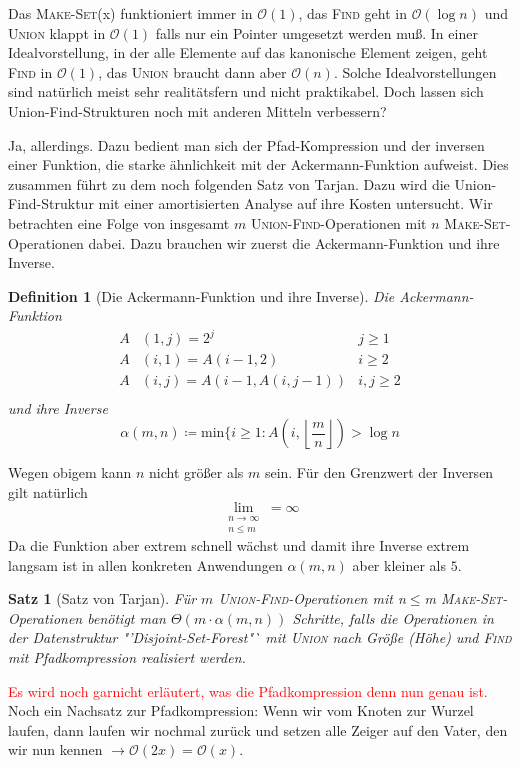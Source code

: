 \documentclass[ngerman,draft,parskip=half*,twoside]{scrreprt}
\theoremstyle{break}
\newtheorem{satz}{Satz}[chapter]
\newtheorem{definition}{Definition}[chapter]
\theoremstyle{nonumberbreak}
\newcommand*{\OO}{\mathcal{O}}      %
\begin{document}
Das \textsc{Make-Set}(x) funktioniert immer in $\OO(1)$, das \textsc{Find} geht in $\OO(\log n)$ und \textsc{Union} klappt in
$\OO(1)$ falls nur ein Pointer umgesetzt werden muß. In einer Idealvorstellung, in der alle Elemente auf das kanonische
Element zeigen, geht \textsc{Find} in $\OO(1)$, das \textsc{Union} braucht dann aber $\OO(n)$. Solche Idealvorstellungen sind
natürlich meist sehr realitätsfern und nicht praktikabel. Doch lassen sich Union-Find-Strukturen noch mit anderen
Mitteln verbessern?

Ja, allerdings. Dazu bedient man sich der Pfad-Kompression und der inversen einer Funktion, die starke ähnlichkeit mit
der Ackermann-Funktion aufweist. Dies zusammen führt zu dem noch folgenden Satz von Tarjan. Dazu wird die
Union-Find-Struktur mit einer amortisierten Analyse auf ihre Kosten untersucht. Wir betrachten eine Folge von insgesamt 
$m$ \textsc{Union-Find}-Operationen mit $n$ \textsc{Make-Set}-Operationen dabei. Dazu brauchen wir zuerst die
Ackermann-Funktion und ihre Inverse.
\begin{definition}[Die Ackermann-Funktion und ihre Inverse]
 Die Ackermann-Funktion
 \begin{align*}
 A&(1,j)=2^j   & j\geq 1\\
 A&(i,1)=A(i-1,2)   & i\geq 2\\
 A&(i,j)=A(i-1, A(i,j-1))   & i,j \geq 2\\
 \end{align*}
 und ihre Inverse
 \[\alpha(m,n)\coloneqq \mbox{min}\{i \geq 1 : A\left(i,\left\lfloor\frac{m}{n}\right\rfloor\right)> \log n\]
\end{definition}
Wegen obigem kann $n$ nicht größer als $m$ sein. Für den Grenzwert der Inversen gilt natürlich
\[\lim_{\substack{n \rightarrow \infty \\n \leq m }}=\infty\]
Da die Funktion aber extrem schnell wächst und damit ihre Inverse extrem langsam ist in allen konkreten Anwendungen 
$\alpha (m,n)$ aber kleiner als $5$. 

\begin{satz}[Satz von Tarjan]
Für $m$ \textsc{Union-Find}-Operationen mit n$\leq$m \textsc{Make-Set}-Operationen benötigt man $\Theta( m \cdot
\alpha(m,n))$ Schritte, falls die Operationen in der Datenstruktur "'Disjoint-Set-Forest"` mit \textsc{Union} nach
Größe (Höhe) und \textsc{Find} mit Pfadkompression realisiert werden.
\end{satz}
\textcolor{red}{Es wird noch garnicht erläutert, was die Pfadkompression denn nun genau ist.}
Noch ein Nachsatz zur Pfadkompression: Wenn wir vom Knoten zur Wurzel laufen, dann laufen wir nochmal zurück und setzen
alle Zeiger auf den Vater, den wir nun kennen $\rightarrow \OO(2x)=\OO(x)$.
\end{document}
